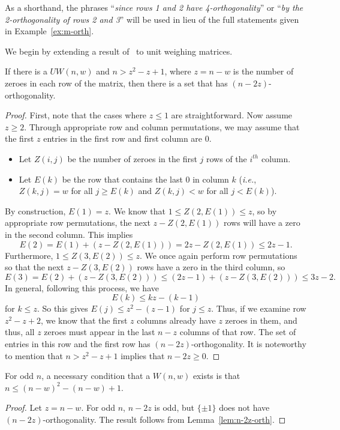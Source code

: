 As a shorthand, the phrases ``{\it since rows 1 and 2 have 4-orthogonality}'' or ``{\it by the 2-orthogonality of rows 2 and 3}'' will be used in lieu of the full statements given in Example~\ref{ex:m-orth}.



We begin by extending a result of~\cite[Proposition 2.5]{od-quad-forms} to unit weighing matrices.

\begin{lemma} \label{lem:n-2z-orth}
 If there is a $UW(n,w)$ and $n > z^2-z+1$, where $z = n-w$ is the number of zeroes in each row of the matrix, then there is a set that has $(n-2z)$-orthogonality.
\begin{proof}
 First, note that the cases where $z\leq1$ are straightforward. Now assume $z\geq2$. Through appropriate row and column permutations, we may assume that the first $z$ entries in the first row and first column are $0$.
\begin{itemize}
 \item Let $Z(i,j)$ be the number of zeroes in the first $j$ rows of the $i^{th}$ column.
 \item Let $E(k)$ be the row that contains the last $0$ in column $k$ ({\it i.e.}, $Z(k,j) = w$ for all $j \geq E(k)$ and $Z(k,j) < w$ for all $j < E(k)$).
\end{itemize}
By construction, $E(1)=z$. We know that $1 \leq Z(2,E(1)) \leq z$, so by appropriate row permutations, the next $z-Z(2,E(1))$ rows will have a zero in the second column. This implies $$E(2) = E(1) + (z-Z(2,E(1))) = 2z-Z(2,E(1)) \leq 2z-1.$$ Furthermore, $1 \leq Z(3,E(2)) \leq z$. We once again perform row permutations so that the next $z-Z(3,E(2))$ rows have a zero in the third column, so $$E(3) = E(2)+(z-Z(3,E(2))) \leq (2z-1)+(z-Z(3,E(2))) \leq 3z - 2.$$ In general, following this process, we have $$E(k) \leq kz-(k-1)$$ for $k \leq z$. So this gives $E(j) \leq z^2-(z-1)$ for $j \leq z$. Thus, if we examine row $z^2-z+2$, we know that the first $z$ columns already have $z$ zeroes in them, and thus, all $z$ zeroes must appear in the last $n-z$ columns of that row. The set of entries in this row and the first row has $(n-2z)$-orthogonality. It is noteworthy to mention that $n > z^2-z+1$ implies that $n-2z \geq 0$. 
\end{proof}
\end{lemma}

\begin{corollary}  \label{cor:n-2z-orth}
 For odd $n$, a necessary condition that a $W(n,w)$ exists is that $n \leq (n-w)^2-(n-w)+1$.
\end{corollary}
\begin{proof}
 Let $z=n-w$. For odd $n$, $n-2z$ is odd, but $\{\pm 1\}$ does not have $(n-2z)$-orthogonality. The result follows from Lemma~\ref{lem:n-2z-orth}.
\end{proof}

